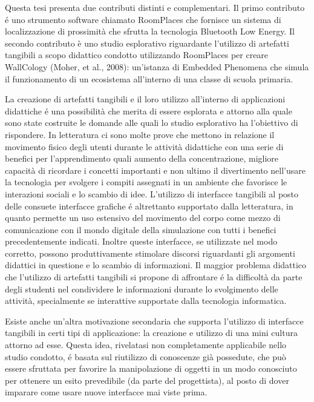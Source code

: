 \estratto

\label{chap:ampio_estratto}

Questa tesi presenta due contributi distinti e complementari. Il primo contributo é uno strumento software chiamato RoomPlaces che fornisce un sistema di localizzazione di prossimità che sfrutta la tecnologia Bluetooth Low Energy. Il secondo contributo è uno studio esplorativo riguardante l’utilizzo di artefatti tangibili a scopo didattico condotto utilizzando RoomPlaces per creare WallCology (Moher, et al., 2008): un’istanza di Embedded Phenomena che simula il funzionamento di un ecosistema all’interno di una classe di scuola primaria.

La creazione di artefatti tangibili e il loro utilizzo all’interno di applicazioni didattiche é una possibilità che merita di essere esplorata e attorno alla quale sono state costruite le domande alle quali lo studio esplorativo ha l’obiettivo di rispondere. In letteratura ci sono molte prove che mettono in relazione il movimento fisico degli utenti durante le attività didattiche con una serie di benefici per l’apprendimento quali aumento della concentrazione, migliore capacità di ricordare i concetti importanti e non ultimo il divertimento nell’usare la tecnologia per svolgere i compiti assegnati in un ambiente che favorisce le interazioni sociali e lo scambio di idee. L’utilizzo di interfacce tangibili al posto delle consuete interfacce grafiche é altrettanto supportato dalla letteratura, in quanto permette un uso estensivo del movimento del corpo come mezzo di comunicazione con il mondo digitale della simulazione con tutti i benefici precedentemente indicati. Inoltre queste interfacce, se utilizzate nel modo corretto, possono produttivamente stimolare discorsi riguardanti gli argomenti didattici in questione e lo scambio di informazioni. Il maggior problema didattico che l’utilizzo di artefatti tangibili si propone di affrontare é la difficoltà da parte degli studenti nel condividere le informazioni durante lo svolgimento delle attività, specialmente se interattive supportate dalla tecnologia informatica. 

Esiste anche un’altra motivazione secondaria che supporta l’utilizzo di interfacce tangibili in certi tipi di applicazione: la creazione e utilizzo di una mini cultura attorno ad esse. Questa idea, rivelatasi non completamente applicabile nello studio condotto, é basata sul riutilizzo di conoscenze già possedute, che può essere sfruttata per favorire la manipolazione di oggetti in un modo conosciuto per ottenere un esito prevedibile (da parte del progettista), al posto di dover imparare come usare nuove interfacce mai viste prima.

